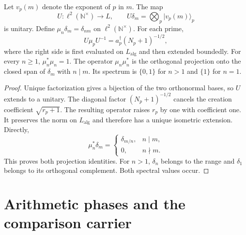 \begin{proposition}
\label{v4-arith:obs:CCR-vs-Cuntz-Toeplitz}
\label{v4-arith:cor:fock-projections-determine-rep}

Let $v_p(m)$ denote the exponent of $p$ in $m$.
The map
\[
 U:\ell^2(\mathbb N^\times)\longrightarrow L,\qquad
 U\delta_m=\bigotimes_p|v_p(m)\rangle_p
\]
is unitary. Define $\mu_n\delta_m=\delta_{nm}$ on
$\ell^2(\mathbb N^\times)$.
For each prime,
\[
 U\mu_pU^{-1}=a_p^\dagger(N_p+1)^{-1/2},
\]
where the right side is first evaluated on $L_{\mathrm{alg}}$
and then extended boundedly.
For every $n\geq1$, $\mu_n^*\mu_n=1$.
The operator $\mu_n\mu_n^*$ is the orthogonal projection onto
the closed span of $\delta_m$ with $n\mid m$.
Its spectrum is $\{0,1\}$ for $n>1$ and $\{1\}$ for $n=1$.
\end{proposition}
\begin{proof}
Unique factorization gives a bijection of the two orthonormal bases,
so $U$ extends to a unitary.
The diagonal factor $(N_p+1)^{-1/2}$ cancels the creation coefficient
$\sqrt{r_p+1}$. The resulting operator raises $r_p$ by one
with coefficient one. It preserves the norm on $L_{\mathrm{alg}}$
and therefore has a unique isometric extension.
Directly,
\[
 \mu_n^*\delta_m=
 \begin{cases}\delta_{m/n},&n\mid m,\\0,&n\nmid m.\end{cases}
\]
This proves both projection identities.
For $n>1$, $\delta_n$ belongs to the range and $\delta_1$
belongs to its orthogonal complement. Both spectral values occur.
\end{proof}

\section{Arithmetic phases and the comparison carrier}
\label{v4-arith:cs:zero-mode-action}

